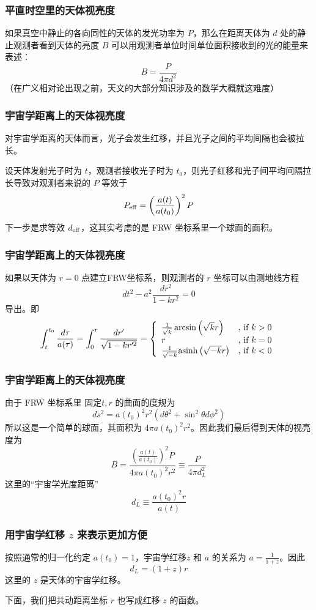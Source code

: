 \documentclass[CJK,13pt]{beamer}
\date{}
\begin{document}
  \bch

  
  \begin{frame}
    \frametitle{平直时空里的天体视亮度}
    如果真空中静止的各向同性的天体的发光功率为 $P$，那么在距离天体为 $d$ 处的静止观测者看到天体的亮度 $B$ 可以用观测者单位时间单位面积接收到的光的能量来表述：
    $$ B = \frac{P}{4\pi d^2}$$
    （在广义相对论出现之前，天文的大部分知识涉及的数学大概就这难度）
  \end{frame}

\begin{frame}
  \frametitle{宇宙学距离上的天体视亮度}
  对宇宙学距离的天体而言，光子会发生红移，并且光子之间的平均间隔也会被拉长。

  设天体发射光子时为 $t$，观测者接收光子时为 $t_0$，则光子红移和光子间平均间隔拉长导致对观测者来说的 $P$ 等效于
  $$P_{\rm eff} = \left(\frac{a(t)}{a(t_0)}\right)^2P$$
  下一步是求等效 $d_{\rm eff}$，这其实考虑的是 FRW 坐标系里一个球面的面积。
\end{frame}

\begin{frame}
  \frametitle{宇宙学距离上的天体视亮度}
  如果以天体为 $r=0$ 点建立FRW坐标系，则观测者的 $r$ 坐标可以由测地线方程
  $$ dt^2 - a^2 \frac{dr^2}{1-kr^2}=0$$
  导出。即
  $$ \int_t^{t_0} \frac{d\tau}{a(\tau)} = \int_0^r\frac{dr'}{\sqrt{1-kr'^2}} =
  \left\{\begin{array}{ll}
  \frac{1}{\sqrt{k}}\arcsin{\left(\sqrt{k}r\right)} & \text{, if } k>0 \\
  r & \text{, if } k=0 \\
  \frac{1}{\sqrt{-k}}\mathrm{asinh}\,{\left(\sqrt{-k}r\right)} & \text{, if } k<0
  \end{array}\right.
  $$
\end{frame}



\begin{frame}
  \frametitle{宇宙学距离上的天体视亮度}
  由于 FRW 坐标系里 固定$t, r$ 的曲面的度规为
  $$ ds^2 = a(t_0)^2 r^2 (d\theta^2 + \sin^2\theta d\phi^2) $$
  所以这是一个简单的球面，其面积为 $4\pi a(t_0)^2r^2$。因此我们最后得到天体的视亮度为
  $$ B = \frac{\left(\frac{a(t)}{a(t_0)}\right)^2P}{4\pi a(t_0)^2 r^2} \equiv \frac{P}{4\pi d_L^2}$$
  这里的“宇宙学光度距离”
  $$ d_L \equiv \frac{a(t_0)^2 r}{a(t)}$$
\end{frame}


\begin{frame}
  \frametitle{用宇宙学红移 $z$ 来表示更加方便}
  按照通常的归一化约定 $a(t_0)=1$，宇宙学红移$z$ 和 $a$ 的关系为 $a = \frac{1}{1+z}$。因此
  $$ d_L = (1+z) r$$
  这里的 $z$ 是天体的宇宙学红移。

  \skipline
  
  下面，我们把共动距离坐标 $r$ 也写成红移 $z$ 的函数。
\end{frame}
\end{document}
